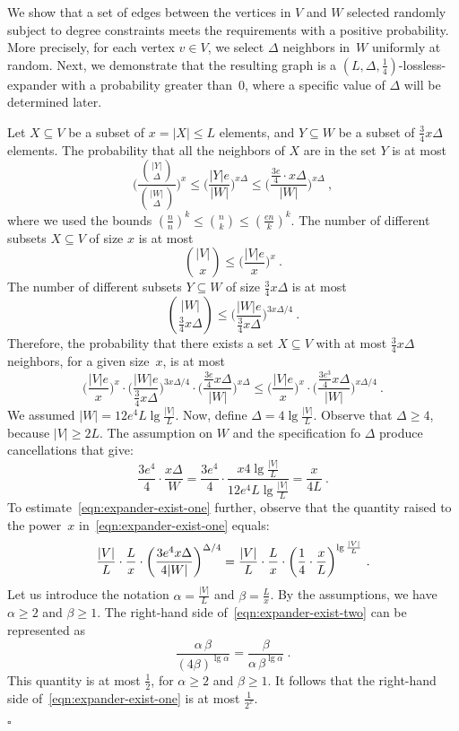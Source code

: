 \documentclass[11pt]{article}
\newcommand{\qed}{\hfill $\square$ \smallbreak}
\newenvironment{proof}{\noindent{\bf Proof:}}{\qed}
\begin{document}
\begin{proof} 
We show that a set of edges between the vertices in $V$ and $W$ selected randomly subject to degree constraints meets the requirements with a positive probability.
More precisely, for each vertex $v\in V$, we select  $\Delta$ neighbors in~$W$ uniformly at random.
Next, we demonstrate that the resulting graph is  a $(L,\Delta,\frac{1}{4})$-lossless-expander with a probability greater than~$0$, where a specific value of $\Delta$ will be determined later.

Let  $X\subseteq V$ be  a subset of $x=|X|\le L$ elements, and $Y\subseteq W$ be a subset of $\frac{3}{4}x\Delta$ elements.
The probability that all the neighbors of $X$ are in the set $Y$ is at most
\[
\biggl(\frac{\binom{|Y|}{\Delta}}{\binom{|W|}{\Delta}}\biggr)^{x} \le
\biggl(\frac{|Y|e}{|W|}\biggr)^{x\Delta} \le
\biggl(\frac{\frac{3e}{4}\cdot x\Delta}{|W|}\biggr)^{x\Delta} 
\ ,
\]
where we used the bounds $(\frac{n}{n})^k\le \binom{n}{k} \le(\frac{en}{k})^k$.
The number of different subsets $X\subseteq V$ of size $x$ is at most
\[
\binom{|V|}{x} \le \biggl(\frac{|V|e}{x}\biggr)^x
\ .
\]
The number of different subsets $Y\subseteq W$ of size $\frac{3}{4}x\Delta$ is at most
\[
\binom{|W|}{\frac{3}{4}x\Delta} \le 
\biggl(\frac{|W|e}{\frac{3}{4}x\Delta}\biggr)^{3x\Delta/4}
\ .
\]
Therefore, the probability that there exists a set $X\subseteq V$ with at most $\frac{3}{4}x\Delta$ neighbors, for a given size~$x$,  is at most 
\begin{equation}
\label{eqn:expander-exist-one}
\biggl(\frac{|V|e}{x}\biggr)^x \cdot 
\biggl(\frac{|W|e}{\frac{3}{4}x\Delta}\biggr)^{3x\Delta/4}
\cdot \biggl(\frac{\frac{3e}{4}x\Delta}{|W|}\biggr)^{x\Delta}
\le
\biggl(\frac{|V|e}{x}\biggr)^x \cdot 
\biggl(\frac{\frac{3e^3}{4}x\Delta}{|W|}\biggr)^{x\Delta/4}
\ .
\end{equation}
We assumed $|W|=12e^4 L\lg\frac{|V|}{L}$.
Now, define $\Delta=4\lg\frac{|V|}{L}$.
Observe that $\Delta\ge 4$, because $|V|\ge 2L$. 
The assumption on $W$ and the specification fo $\Delta$ produce cancellations that give:
\[
\frac{3e^4}{4} \cdot \frac{x\Delta}{W}= \frac{3e^4}{4} \cdot \frac{x4\lg\frac{|V|}{L}}{12e^4 L\lg\frac{|V|}{L}} =\frac{x}{4L}
\ .
\]
To estimate~\eqref{eqn:expander-exist-one} further, observe that the quantity raised to the power~$x$ in~\eqref{eqn:expander-exist-one} equals:
\begin{equation}
\label{eqn:expander-exist-two}
\frac{|V|}{L}\cdot \frac{L}{x} \cdot 
\biggl(\frac{3e^4x\Delta}{4 |W|}\biggr)^{\Delta/4}\\
=
\frac{|V|}{L}\cdot\frac{L}{x} \cdot
\biggl(\frac{1}{4}\cdot \frac{x}{L}\biggr)^{\lg\frac{|V|}{L}}
\ .
\end{equation}
Let us introduce the notation $\alpha=\frac{|V|}{L}$ and $\beta= \frac{L}{x}$.
By the assumptions, we have $\alpha\ge 2$ and $\beta\ge 1$.
The right-hand side of~\eqref{eqn:expander-exist-two} can be represented as
\[
\frac{\alpha \,\beta}{(4\beta)^{\lg \alpha}} = \frac{\beta}{\alpha\, \beta^{\lg \alpha}}
\ .
\]
This quantity is at most $\frac{1}{2}$, for $\alpha \ge 2$ and $\beta\ge 1$.
It follows that the right-hand side of~\eqref{eqn:expander-exist-one} is at most $\frac{1}{2^x}$.


\end{proof}
\end{document}
